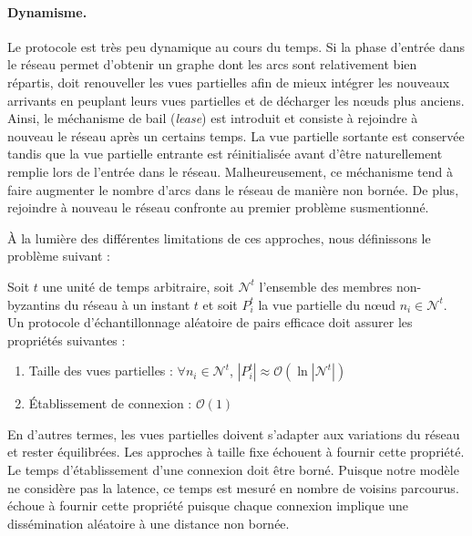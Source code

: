 \paragraph{Dynamisme.} Le protocole est très peu dynamique au cours du temps. Si
la phase d'entrée dans le réseau permet d'obtenir un graphe dont les arcs sont
relativement bien répartis, \SCAMP doit renouveller les vues partielles afin de
mieux intégrer les nouveaux arrivants en peuplant leurs vues partielles et de
décharger les nœuds plus anciens. Ainsi, le méchanisme de bail (\emph{lease})
est introduit et consiste à rejoindre à nouveau le réseau après un certains
temps. La vue partielle sortante est conservée tandis que la vue partielle
entrante est réinitialisée avant d'être naturellement remplie lors de l'entrée
dans le réseau. Malheureusement, ce méchanisme tend à faire augmenter le nombre
d'arcs dans le réseau de manière non bornée. De plus, rejoindre à nouveau le
réseau confronte au premier problème susmentionné.


À la lumière des différentes limitations de ces approches, nous définissons le
problème suivant :

\begin{problem}
  \label{net:problem:properties}
  Soit $t$ une unité de temps arbitraire, soit $\mathcal{N}^t$ l'ensemble des
  membres non-byzantins du réseau à un instant $t$ et soit $P_i^t$ la vue
  partielle du nœud $n_i \in \mathcal{N}^t$. Un protocole d'échantillonnage
  aléatoire de pairs efficace doit assurer les propriétés suivantes :
  \begin{enumerate}
  \item Taille des vues partielles : \hfill $\forall n_i \in \mathcal{N}^t$,
    $|P_i^t| \approx \mathcal{O}(\ln |\mathcal{N}^t|)$
  \item Établissement de connexion : \hfill $\mathcal{O}(1)$
  \end{enumerate}
\end{problem}
En d'autres termes, les vues partielles doivent s'adapter aux variations du
réseau et rester équilibrées. Les approches à taille fixe échouent à fournir
cette propriété. Le temps d'établissement d'une connexion doit être
borné. Puisque notre modèle ne considère pas la latence, ce temps est mesuré en
nombre de voisins parcourus. \SCAMP échoue à fournir cette propriété puisque
chaque connexion implique une dissémination aléatoire à une distance non bornée.

